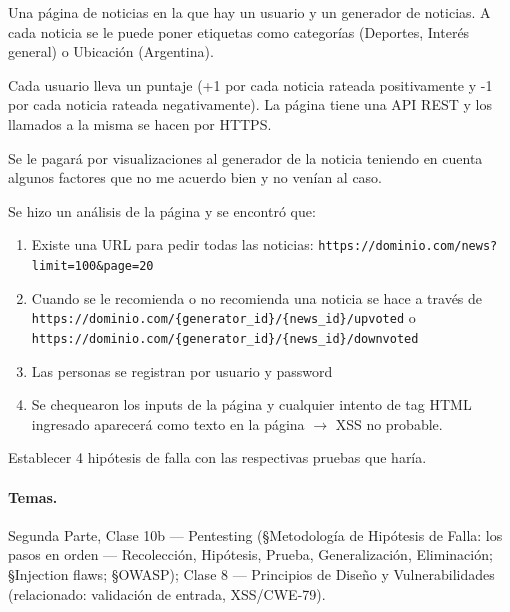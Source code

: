 \begin{consigna}
Una página de noticias en la que hay un usuario y un generador de noticias. A cada noticia se
le puede poner etiquetas como categorías (Deportes, Interés general) o Ubicación (Argentina).

Cada usuario lleva un puntaje (+1 por cada noticia rateada positivamente y -1 por cada noticia
rateada negativamente). La página tiene una API REST y los llamados a la misma se hacen por
HTTPS.

Se le pagará por visualizaciones al generador de la noticia teniendo en cuenta algunos
factores que no me acuerdo bien y no venían al caso.

Se hizo un análisis de la página y se encontró que:
\begin{enumerate}
  \item Existe una URL para pedir todas las noticias:
  \texttt{https://dominio.com/news?limit=100\&page=20}
  \item Cuando se le recomienda o no recomienda una noticia se hace a través de
  \texttt{https://dominio.com/\{generator\_id\}/\{news\_id\}/upvoted} o
  \texttt{https://dominio.com/\{generator\_id\}/\{news\_id\}/downvoted}
  \item Las personas se registran por usuario y password
  \item Se chequearon los inputs de la página y cualquier intento de tag HTML ingresado
  aparecerá como texto en la página $\rightarrow$ XSS no probable.
\end{enumerate}
Establecer 4 hipótesis de falla con las respectivas pruebas que haría.
\end{consigna}

\paragraph{Temas.}
Segunda Parte, Clase 10b --- Pentesting (\S Metodología de Hipótesis de Falla: los pasos en
orden --- Recolección, Hipótesis, Prueba, Generalización, Eliminación; \S Injection flaws;
\S OWASP); Clase 8 --- Principios de Diseño y Vulnerabilidades (relacionado: validación de
entrada, XSS/CWE-79).

